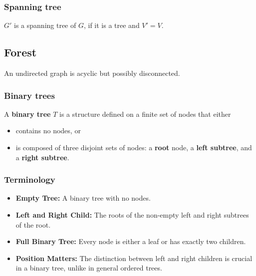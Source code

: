 \subsubsection{Spanning tree}
\begin{definition}
    $G'$ is a spanning tree of $G$, if it is a tree and $V'=V$.
\end{definition}

\subsection{Forest}
\begin{definition}
    An undirected graph is acyclic but possibly disconnected.
\end{definition}


\subsubsection{Binary trees}
\begin{definition}
    A \textbf{binary tree} $T$ is a structure defined on a finite set of nodes that either
    \begin{itemize}
        \item contains no nodes, or 
        \item is composed of three disjoint sets of nodes: a \textbf{root} node, a \textbf{left subtree}, and a \textbf{right subtree}.
    \end{itemize}
\end{definition}

\subsubsection{Terminology}
\begin{terminology}
    \begin{itemize}
        \item \textbf{Empty Tree:} A binary tree with no nodes.
        \item \textbf{Left and Right Child:} The roots of the non-empty left and right subtrees of the root.
        \item \textbf{Full Binary Tree:} Every node is either a leaf or has exactly two children.
        \item \textbf{Position Matters:} The distinction between left and right children is crucial in a binary tree, unlike in general ordered trees.
    \end{itemize}
\end{terminology}

